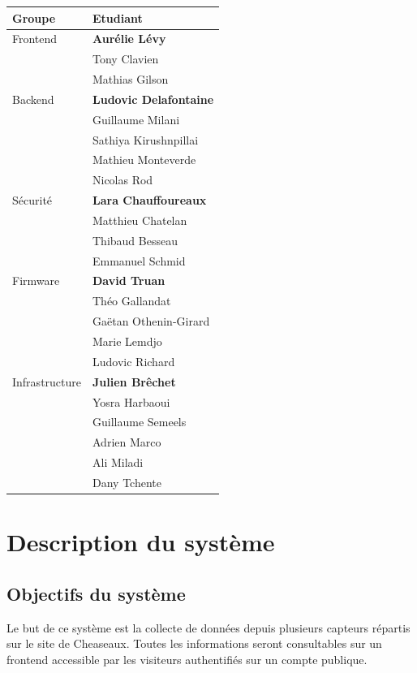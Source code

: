 \documentclass[12pt]{article}
\begin{document}
\renewcommand{\arraystretch}{1.2}
\begin{center}
\begin{tabular}{|l|l|}
	\hline
	Groupe & Etudiant \\
	\hline
	Frontend & \textbf{Aurélie Lévy}  \\
	& Tony Clavien\\
	& Mathias Gilson\\
	\hline
	Backend & \textbf{Ludovic Delafontaine}   \\
	& Guillaume Milani\\
	& Sathiya Kirushnpillai\\
	& Mathieu Monteverde\\
	& Nicolas Rod\\
	\hline
	Sécurité & \textbf{Lara Chauffoureaux}  \\
	& Matthieu Chatelan  \\
	& Thibaud Besseau  \\
	& Emmanuel Schmid  \\
	\hline
	Firmware & \textbf{David Truan} \\
	& Théo Gallandat\\
	& Gaëtan Othenin-Girard\\
	& Marie Lemdjo\\
	& Ludovic Richard\\
	\hline
	Infrastructure & \textbf{Julien Brêchet} \\
	& Yosra Harbaoui\\
	& Guillaume Semeels\\
	& Adrien Marco\\
	& Ali Miladi\\
	& Dany Tchente\\
	\hline
\end{tabular}
\end{center}
\renewcommand{\arraystretch}{1}

\newpage
\section{Description du système}

\subsection{Objectifs du système}\label{objectifssysteme}%

Le but de ce système est la collecte de données depuis plusieurs capteurs répartis sur le site de Cheaseaux. Toutes les informations seront consultables sur un frontend accessible par les visiteurs authentifiés sur un compte publique.
\end{document}
